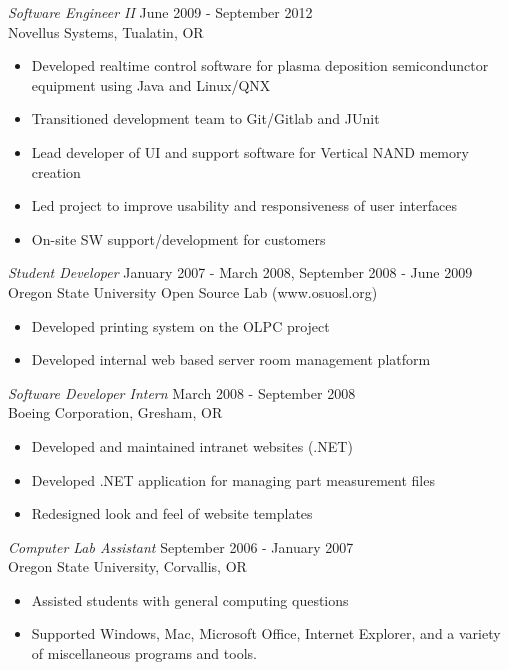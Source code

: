 \documentclass[margin]{res}
\begin{document}
\begin{resume}
                {\sl Software Engineer II} \hfill June 2009 -  September 2012 \\
                Novellus Systems,  Tualatin, OR 
                 \begin{itemize}  \itemsep -2pt %
                 	\item Developed realtime control software for 
				 plasma deposition semicondunctor equipment using Java and Linux/QNX
                		\item Transitioned development team to Git/Gitlab and JUnit 
                		\item Lead developer of UI and support software for Vertical NAND memory creation 
			\item Led project to improve usability and responsiveness of user interfaces
			\item On-site SW support/development for customers
                \end{itemize}
 \newpage
                {\sl Student Developer} \hfill            January 2007 - March 2008, September 2008 - June 2009 \\
                Oregon State University Open Source Lab (www.osuosl.org)
                 \begin{itemize}  \itemsep -2pt %
                 	\item Developed printing system on the OLPC project
			\item Developed internal web based server room management platform
                 \end{itemize}

                {\sl Software Developer Intern} \hfill         March 2008 - September 2008\\
                Boeing Corporation, Gresham, OR
               	\begin{itemize}  \itemsep -2pt %
                  	\item Developed and maintained intranet websites (.NET)
			\item Developed .NET application for managing part measurement files
			\item Redesigned look and feel of website templates
               	\end{itemize} 
 
 		{\sl Computer Lab Assistant} \hfill         September 2006 - January 2007\\
                Oregon State University, Corvallis, OR
                 \begin{itemize}  \itemsep -2pt %
                 	\item Assisted students with general computing questions
			\item Supported Windows, Mac, Microsoft Office, Internet Explorer, and a variety
				   of miscellaneous programs and tools.
               	\end{itemize} 
\end{resume}
\end{document}
